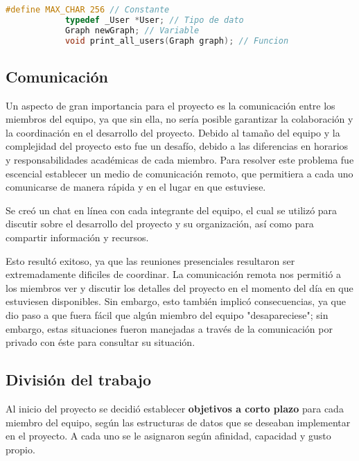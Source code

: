\documentclass[9pt,letterpaper,onecolumn]{rho-class/rho}
\begin{document}
        \begin{lstlisting}[caption={Ejemplo de código, utilizando las normas de codificación}, label={lst:normas_codificacion}, language=C]
            #define MAX_CHAR 256 // Constante
            typedef _User *User; // Tipo de dato
            Graph newGraph; // Variable
            void print_all_users(Graph graph); // Funcion
        \end{lstlisting}

    \subsection{Comunicación}

    Un aspecto de gran importancia para el proyecto es la comunicación entre los miembros del equipo, ya que sin ella, no sería posible garantizar la colaboración y la coordinación en el desarrollo del proyecto. Debido al tamaño del equipo y la complejidad del proyecto esto fue un desafío, debido a las diferencias en horarios y responsabilidades académicas de cada miembro. Para resolver este problema fue escencial establecer un medio de comunicación remoto, que permitiera a cada uno comunicarse de manera rápida y en el lugar en que estuviese.

    Se creó un chat en línea con cada integrante del equipo, el cual se utilizó para discutir sobre el desarrollo del proyecto y su organización, así como para compartir información y recursos.

    \vspace{0.5cm}

    Esto resultó exitoso, ya que las reuniones presenciales resultaron ser extremadamente dificiles de coordinar. La comunicación remota nos permitió a los miembros ver y discutir los detalles del proyecto en el momento del día en que estuviesen disponibles. Sin embargo, esto también implicó consecuencias, ya que dio paso a que fuera fácil que algún miembro del equipo "desapareciese"; sin embargo, estas situaciones fueron manejadas a través de la comunicación por privado con éste para consultar su situación.

    \subsection{División del trabajo}

    Al inicio del proyecto se decidió establecer \textbf{objetivos a corto plazo} para cada miembro del equipo, según las estructuras de datos que se deseaban implementar en el proyecto. A cada uno se le asignaron según afinidad, capacidad y gusto propio.
\end{document}
